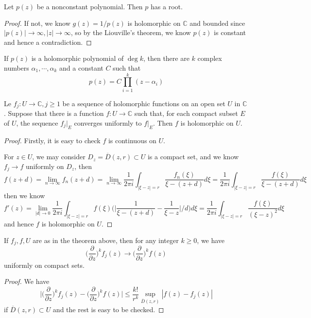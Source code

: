 \documentclass[lang=en, color=blue, ]{elegantbook}
\newcommand{\C}{\mathbb{C}}
\newcommand{\ParZ}{\dfrac{\partial}{\partial z}}
\begin{document}
\begin{theorem}
    Let $p(z)$ be a nonconstant polynomial. Then $p$ has a root.
\end{theorem}
\begin{proof}\par
    If not, we know $g(z) = 1/p(z)$ is holomorphic on $\C$ and bounded since $|p(z)| \to\infty , |z|\to\infty$, so by the Liouville's theorem, we know $p(z)$ is constant and hence a contradiction.
\end{proof}

\begin{corollary}
    If $p(z)$ is a holomorphic polynomial of $\deg k$, then there are $k$ complex numbers $\alpha_1,\cdots,\alpha_k$ and a constant $C$ such that
    \[p(z) = C\prod_{i=1}^k(z-\alpha_i)\]
\end{corollary}

\begin{theorem}
    Le $f_j:U\to\C, j\geq 1$ be a sequence of holomorphic functions on an open set $U$ in $\C$. Suppose that there is a function $f:U\to\C$ such that, for each compact subset $E$ of $U$, the sequence $f_j|_E$ converges uniformly to $f|_E$. Then $f$ is holomorphic on $U$. 
\end{theorem}
\begin{proof}\par
    Firstly, it is easy to check $f$ is continuous on $U$.\par
    For $z\in U$, we may consider $D_z = \overline{D}(z,r) \subset U$ is a compact set, and we know $f_j\to f$ uniformly on $D_z$, then
    \[
    f(z+d) = \lim_{n\to\infty} f_n(z+d) = \lim_{n\to\infty} \dfrac{1}{2\pi i}\int_{|\xi-z| = r}\dfrac{f_n(\xi)}{\xi - (z+d)}d\xi = \dfrac{1}{2\pi i }\int_{|\xi-z| = r}\dfrac{f(\xi)}{\xi - (z+d)}d\xi
    \]
    then we know
    \[
    f'(z) = \lim_{|d|\to 0} \dfrac{1}{2\pi i}\int_{|\xi-z|=r} f(\xi)\Big(\Big|\dfrac{1}{\xi-(z+d)}-\dfrac{1}{\xi-z}\Big|/d\Big) d\xi = \dfrac{1}{2\pi i}\int_{|\xi-z|=r} \dfrac{f(\xi)}{(\xi-z)^2} d\xi
    \]
    and hence $f$ is holomorphic on $U$.
\end{proof}

\begin{corollary}
    If $f_j,f,U$ are as in the theorem above, then for any integer $k\geq 0$, we have
    \[
    \Big(\ParZ\Big)^k f_j(z) \to \Big(\ParZ\Big)^k f(z)
    \]
    uniformly on compact sets.
\end{corollary}
\begin{proof}
    We have
    \[
    \Big|\Big(\ParZ\Big)^k f_j(z) -  \Big(\ParZ\Big)^k f(z)\Big| \leq \dfrac{k!}{r^k} \sup_{\overline{D}(z,r)}|f(z)-f_j(z)|
    \]
    if $\overline{D}(z,r) \subset U$ and the rest is easy to be checked.
\end{proof}
\end{document}
